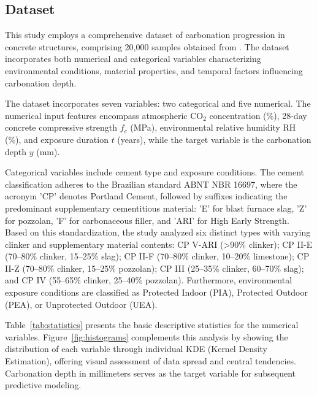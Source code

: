 \subsection{Dataset}

This study employs a comprehensive dataset of carbonation progression in concrete structures, comprising 20,000 samples obtained from \citet{couto_machine_2025}. The dataset incorporates both numerical and categorical variables characterizing environmental conditions, material properties, and temporal factors influencing carbonation depth.

The dataset incorporates seven variables: two categorical and five numerical. The numerical input features encompass atmospheric CO$_2$ concentration (\%), 28-day concrete compressive strength $f_c$ (MPa), environmental relative humidity RH (\%), and exposure duration $t$ (years), while the target variable is the carbonation depth $y$ (mm).

Categorical variables include cement type and exposure conditions. The cement classification adheres to the Brazilian standard ABNT NBR 16697, where the acronym 'CP' denotes Portland Cement, followed by suffixes indicating the predominant supplementary cementitious material: 'E' for blast furnace slag, 'Z' for pozzolan, 'F' for carbonaceous filler, and 'ARI' for High Early Strength. Based on this standardization, the study analyzed six distinct types with varying clinker and supplementary material contents: CP V-ARI (>90\% clinker); CP II-E (70--80\% clinker, 15--25\% slag); CP II-F (70--80\% clinker, 10--20\% limestone); CP II-Z (70--80\% clinker, 15--25\% pozzolan); CP III (25--35\% clinker, 60--70\% slag); and CP IV (55--65\% clinker, 25--40\% pozzolan). Furthermore, environmental exposure conditions are classified as Protected Indoor (PIA), Protected Outdoor (PEA), or Unprotected Outdoor (UEA).

Table~\ref{tab:statistics} presents the basic descriptive statistics for the numerical variables. Figure~\ref{fig:histograms} complements this analysis by showing the distribution of each variable through individual KDE (Kernel Density Estimation), offering visual assessment of data spread and central tendencies. Carbonation depth in millimeters serves as the target variable for subsequent predictive modeling.

